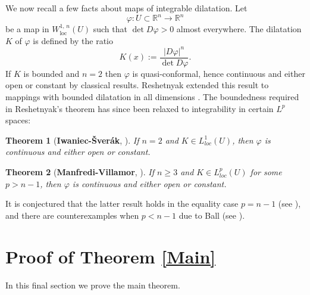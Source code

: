 \documentclass{amsart}
\newtheorem{thm}{Theorem}[section]
\theoremstyle{definition}
\theoremstyle{remark}
\begin{document}
\vspace{2mm}

We now recall a few facts about maps of integrable dilatation. Let 
$$\varphi: U \subset \mathbb{R}^n \rightarrow \mathbb{R}^n$$ 
be a map in $W^{1,\,n}_{\text{loc}}(U)$ such that $\det D\varphi > 0$ almost everywhere. The dilatation $K$ of $\varphi$ is defined by the ratio
$$K(x) := \frac{|D\varphi|^n}{\det D\varphi}.$$
If $K$ is bounded and $n = 2$ then $\varphi$ is quasi-conformal, hence continuous and either open or constant by classical results. Reshetnyak extended this result to mappings with bounded dilatation in all dimensions \cite{R}. The boundedness required in Reshetnyak's theorem has since been relaxed to integrability in certain $L^p$ spaces:

\begin{thm}[{\bf Iwaniec-\v{S}ver\'{a}k}, \cite{IS}]\label{OM1}
If $n = 2$ and $K \in L^1_{loc}(U)$, then $\varphi$ is continuous and either open or constant.
\end{thm}

\begin{thm}[{\bf Manfredi-Villamor}, \cite{MV}]\label{OM2}
If $n \geq 3$ and $K \in L^p_{loc}(U)$ for some $p > n-1$, then $\varphi$ is continuous and either open or constant.
\end{thm}

\noindent It is conjectured that the latter result holds in the equality case $p = n-1$ (see \cite{IS}), and there are counterexamples when $p < n-1$ due to Ball (see \cite{B}).

\section{Proof of Theorem \ref{Main}}\label{Proof}

In this final section we prove the main theorem.
\end{document}
